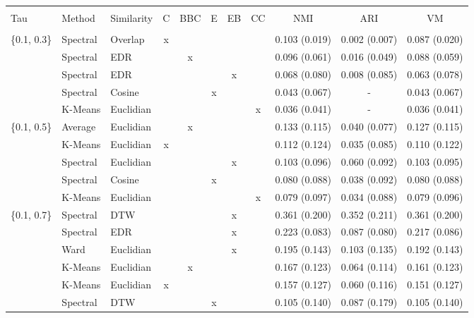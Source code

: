 \documentclass[12pt,a4paper,bibliography=totocnumbered,listof=totocnumbered]{scrartcl}
\begin{document}
\begin{appendix}
\begin{table}[!htbp] \centering 
	\label{} 
	\scriptsize
		\begin{tabularx}{\textwidth}{ lllcccccccc} \\
		\\[-1.8ex]	\toprule
	 \\[-1.8ex] 
		Tau & Method & Similarity & C & BBC & E & EB & CC & NMI & ARI & VM \\ 
		\hline \\[-1.8ex] 
		\{0.1, 0.3\} & Spectral  & Overlap & x &  &  &  &  & 0.103 (0.019) & 0.002 (0.007) & 0.087 (0.020) \\ 
		& Spectral  & EDR &  & x &  &  &  & 0.096 (0.061) & 0.016 (0.049) & 0.088 (0.059) \\ 
		& Spectral  & EDR &  &  &  & x &  & 0.068 (0.080) & 0.008 (0.085) & 0.063 (0.078) \\ 
		& Spectral  & Cosine &  &  & x &  &  & 0.043 (0.067) & - & 0.043 (0.067) \\ 
		& K-Means & Euclidian  &  &  &  &  & x & 0.036 (0.041) &  -  & 0.036 (0.041) \\ 
		\{0.1, 0.5\} & Average & Euclidian  &  & x &  &  &  & 0.133 (0.115) & 0.040 (0.077) & 0.127 (0.115) \\ 
		& K-Means & Euclidian  & x &  &  &  &  & 0.112 (0.124) & 0.035 (0.085) & 0.110 (0.122) \\ 
		& Spectral  & Euclidian  &  &  &  & x &  & 0.103 (0.096) & 0.060 (0.092) & 0.103 (0.095) \\ 
		& Spectral  & Cosine &  &  & x &  &  & 0.080 (0.088) & 0.038 (0.092) & 0.080 (0.088) \\ 
		& K-Means & Euclidian  &  &  &  &  & x & 0.079 (0.097) & 0.034 (0.088) & 0.079 (0.096) \\ 
		\{0.1, 0.7\} & Spectral  & DTW &  &  &  & x &  & 0.361 (0.200) & 0.352 (0.211) & 0.361 (0.200) \\ 
		& Spectral  & EDR &  &  &  & x &  & 0.223 (0.083) & 0.087 (0.080) & 0.217 (0.086) \\ 
		& Ward & Euclidian  &  &  &  & x &  & 0.195 (0.143) & 0.103 (0.135) & 0.192 (0.143) \\ 
		& K-Means & Euclidian  &  & x &  &  &  & 0.167 (0.123) & 0.064 (0.114) & 0.161 (0.123) \\ 
		& K-Means & Euclidian  & x &  &  &  &  & 0.157 (0.127) & 0.060 (0.116) & 0.151 (0.127) \\ 
		& Spectral  & DTW &  &  & x &  &  & 0.105 (0.140) & 0.087 (0.179) & 0.105 (0.140) \\ 

\end{tabularx}
\end{table}
\end{appendix}
\end{document}
